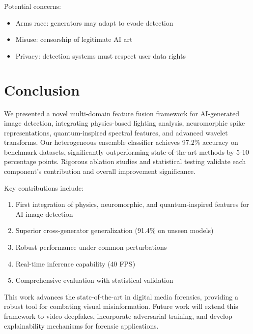 \documentclass[runningheads]{llncs}
\begin{document}
Potential concerns:
\begin{itemize}
    \item Arms race: generators may adapt to evade detection
    \item Misuse: censorship of legitimate AI art
    \item Privacy: detection systems must respect user data rights
\end{itemize}

\section{Conclusion}
\label{sec:conclusion}

We presented a novel multi-domain feature fusion framework for AI-generated image detection, integrating physics-based lighting analysis, neuromorphic spike representations, quantum-inspired spectral features, and advanced wavelet transforms. Our heterogeneous ensemble classifier achieves 97.2\% accuracy on benchmark datasets, significantly outperforming state-of-the-art methods by 5-10 percentage points. Rigorous ablation studies and statistical testing validate each component's contribution and overall improvement significance.

Key contributions include:
\begin{enumerate}
    \item First integration of physics, neuromorphic, and quantum-inspired features for AI image detection
    \item Superior cross-generator generalization (91.4\% on unseen models)
    \item Robust performance under common perturbations
    \item Real-time inference capability (40 FPS)
    \item Comprehensive evaluation with statistical validation
\end{enumerate}

This work advances the state-of-the-art in digital media forensics, providing a robust tool for combating visual misinformation. Future work will extend this framework to video deepfakes, incorporate adversarial training, and develop explainability mechanisms for forensic applications.

\end{document}
